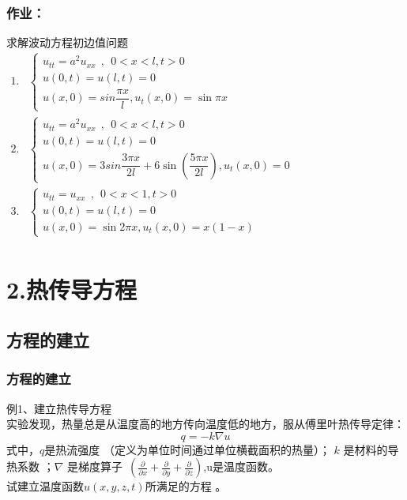 \begin{frame}
	\frametitle{作业：}	
	求解波动方程初边值问题
	$\begin{array}{lllllllll}
	1. & \begin{cases}
		u_{tt} =a^2u_{xx} ~~,~~ 0<x<l, t>0\\
		u(0,t) =u(l,t)=0 \\
		u(x,0) =sin \dfrac{\pi x}{l} ,  u_t (x,0)=\sin \pi x 
	\end{cases}\\	
	2. &\begin{cases}
		u_{tt} =a^2u_{xx} ~~,~~ 0<x<l, t>0\\
		u(0,t) =u(l,t)=0 \\
		u(x,0) =3sin \dfrac{3\pi x}{2l} +6\sin(\dfrac{5\pi x}{2l}),  u_t (x,0)=0
	\end{cases} \\	
	3. &\begin{cases}
		u_{tt} =u_{xx} ~~,~~ 0<x<1, t>0\\
		u(0,t) =u(l,t)=0  \\
		u(x,0) =\sin 2\pi x ,  u_t (x,0)=x (1-x) 
	\end{cases} \\	
	\end{array}$ \\ 	
\end{frame}	


\section{2.热传导方程}
\subsection{方程的建立}
\begin{frame}
	\frametitle{方程的建立}	
	\begin{exampleblock} {例1、建立热传导方程}
		~~\\
		实验发现，热量总是从温度高的地方传向温度低的地方，服从傅里叶热传导定律：
		\begin{equation*}
			q=-k\nabla u
		\end{equation*}
		式中，$q$是热流强度 （定义为单位时间通过单位横截面积的热量）； $k$ 是材料的导热系数 ；$\nabla $ 是梯度算子~$(\frac{\partial }{\partial x} +\frac{\partial }{\partial y} +\frac{\partial }{\partial z})$,u是温度函数。\\
		试建立温度函数$u(x,y,z,t)$所满足的方程 。\\		
	\end{exampleblock}
\end{frame}	

